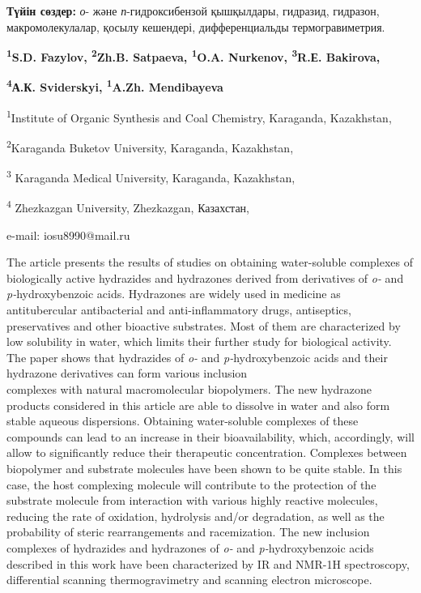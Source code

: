 {\bfseries Түйін сөздер:} \emph{о}- және \emph{п}-гидроксибензой
қышқылдары, гидразид, гидразон, макромолекулалар, қосылу кешендері,
дифференциальды термогравиметрия.


\begin{center}
{\bfseries \textsuperscript{1}S.D. Fazylov\envelope, \textsuperscript{2}Zh.B.
Satpaeva, \textsuperscript{1}O.A. Nurkenov, \textsuperscript{3}R.Е.
Bakirova,}

{\bfseries \textsuperscript{4}А.К. Sviderskyi, \textsuperscript{1}A.Zh.
Mendibayeva}

\textsuperscript{1}Institute of Organic Synthesis and Coal Chemistry,
Karaganda, Kazakhstan,

\textsuperscript{2}Karaganda Buketov University, Karaganda, Kazakhstan,

\textsuperscript{3} Karaganda Medical University, Karaganda, Kazakhstan,

\textsuperscript{4} Zhezkazgan University, Zhezkazgan, Казахстан,

e-mail: iosu8990@mail.ru
\end{center}

The article presents the results of studies on obtaining water-soluble
complexes of biologically active hydrazides and hydrazones derived from
derivatives of \emph{o-} and \emph{p-}hydroxybenzoic acids. Hydrazones
are widely used in medicine as antitubercular antibacterial and
anti-inflammatory drugs, antiseptics, preservatives and other bioactive
substrates. Most of them are characterized by low solubility in water,
which limits their further study for biological activity. The paper
shows that hydrazides of \emph{o-} and \emph{p-}hydroxybenzoic acids and
their hydrazone derivatives can form various inclusion \\complexes with
natural macromolecular biopolymers. The new hydrazone products
considered in this article are able to dissolve in water and also form
stable aqueous dispersions. Obtaining water-soluble complexes of these
compounds can lead to an increase in their bioavailability, which,
accordingly, will allow to significantly reduce their therapeutic
concentration. Complexes between biopolymer and substrate molecules have
been shown to be quite stable. In this case, the host complexing
molecule will contribute to the protection of the substrate molecule
from interaction with various highly reactive molecules, reducing the
rate of oxidation, hydrolysis and/or degradation, as well as the
probability of steric rearrangements and racemization. The new inclusion
complexes of hydrazides and hydrazones of \emph{o-} and
\emph{p-}hydroxybenzoic acids described in this work have been
characterized by IR and NMR-1H spectroscopy, differential scanning
thermogravimetry and scanning electron microscope.

